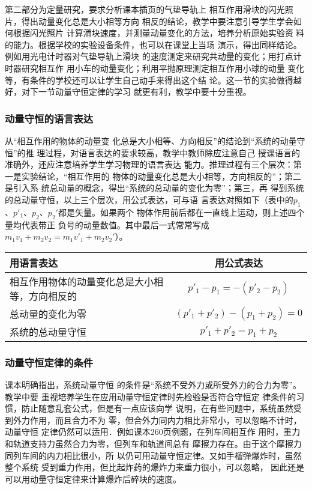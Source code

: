 第二部分为定量研究，要求分析课本插页的气垫导轨上
相互作用滑块的闪光照片，得出动量变化总是大小相等方向
相反的结论，教学中要注意引导学生学会如何根据闪光照片
计算滑块速度，并测量动量变化的方法，培养分析原始实验资
料的能力。根据学校的实验设备条件，也可以在课堂上当场
演示，得出同样结论。例如用光电计时器对气垫导轨上滑块
的速度测定来研究共动量的变化；用打点计时器研究相互作
用小车的动量变化；利用平抛原理测定相互作用小球的动量
变化等，有条件的学校还可以让学生自己动手来得出这个结
论。这一节的实验做得越好，对下一节动量守恒定律的学习
就更有利，教学中要十分重视。

\subsubsection{动量守恒的语言表达}

从“相互作用的物体的动量变
化总是大小相等、方向相反”的结论到“系统的动量守恒”的推
理过程，对语言表达的要求较高，教学中教师除应注意自己
授课语言的准确外，还应注意培养学生学习物理的语言表达
能力。推理过程有三个层次：第一是实验结论，“相互作用的
物体的动量变化总是大小相等，方向相反的”；第二是引入系
统总动量的概念，得出“系统的总动量的变化为零”；第三，再
得到系统的总动量守恒，以上三个层次，用公式表达，可与语
言表达对照如下（表中的$p_1$、$p'_1$、$p_2$、$p_2'$都是矢量。如果两个
物体作用前后都在一直线上运动，则上述四个量均代表带正
负号的动量数值。其中最后一式常常写成$m_1v_1+m_2v_2=m_1v'_1
+m_2v_2'$）。

\begin{center}
\begin{tabular}{p{}c}
    \hline
    用语言表达&用公式表达\\
    \hline
    相互作用物体的动量变化总是大小相等，方向相反的&$p'_1-p_1=-(p'_2-p_2)$\\
    总动量的变化为零&$(p'_1+p'_2)-(p_1+p_2)=0$\\
    系统的总动量守恒&$p'_1+p'_2=p_1+p_2$\\
    \hline
\end{tabular}
\end{center}

\subsubsection{动量守恒定律的条件}
课本明确指出，系统动量守恒
的条件是“系统不受外力或所受外力的合力为零”。教学中要
重视培养学生在应用动量守恒定律时先检验是否符合守恒定
律条件的习惯，防止随意乱套公式，但是有一点应该向学
说明，在有些问题中，系统虽然受到外力作用，而且合力不为
零，但合外力同内力相比非常小，可以忽略不计时，动量守恒
定律仍然可以适用．例如课本260页例题，在列车间相互作
用时，重力和轨道支持力虽然合力为零，但列车和轨道间总有
摩擦力存在。由于这个摩擦力同列车间的内力相比很小，所
以仍可用动量守恒定律。又如手榴弹爆炸时，虽然整个系统
受到重力作用，但比起炸药的爆炸力来重力很小，可以忽略，
因此还是可以用动量守恒定律来计算爆炸后碎块的速度。

